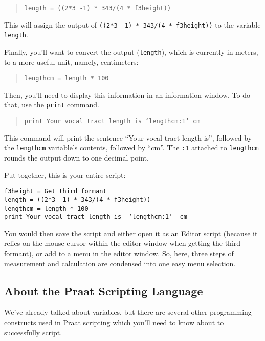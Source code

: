 \documentclass[11pt]{article}
\begin{document}
\begin{quote}
\texttt{length = ((2*3 -1) * 343/(4 * f3height))}
\end{quote}

This will assign the output of \texttt{((2*3 -1) * 343/(4 * f3height))}
to the variable \texttt{length}.

Finally, you'll want to convert the output (\texttt{length}), which is
currently in meters, to a more useful unit, namely, centimeters:

\begin{quote}
\texttt{lengthcm = length * 100}
\end{quote}

Then, you'll need to display this information in an information window.
To do that, use the \texttt{print} command.

\begin{quote}
\texttt{print Your vocal tract length is  ‘lengthcm:1’  cm}
\end{quote}

This command will print the sentence ``Your vocal tract length is'',
followed by the \texttt{lengthcm} variable's contents, followed by
``cm''. The \texttt{:1} attached to \texttt{lengthcm} rounds the output
down to one decimal point.

Put together, this is your entire script:

\begin{verbatim} 
f3height = Get third formant
length = ((2*3 -1) * 343/(4 * f3height))
lengthcm = length * 100
print Your vocal tract length is  ‘lengthcm:1’  cm
\end{verbatim}

You would then save the script and either open it as an Editor script
(because it relies on the mouse cursor within the editor window when
getting the third formant), or add to a menu in the editor window. So,
here, three steps of measurement and calculation are condensed into one
easy menu selection.

\hypertarget{about-the-praat-scripting-language}{%
\subsection{About the Praat Scripting
Language}\label{about-the-praat-scripting-language}}

We've already talked about variables, but there are several other
programming constructs used in Praat scripting which you'll need to know
about to successfully script.
\end{document}
